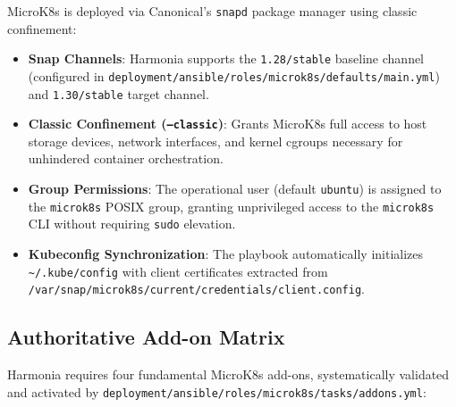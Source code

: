 MicroK8s is deployed via Canonical's \texttt{snapd} package manager using classic confinement:
\begin{itemize}
    \item \textbf{Snap Channels}: Harmonia supports the \texttt{1.28/stable} baseline channel (configured in \texttt{deployment/ansible/roles/microk8s/defaults/main.yml}) and \texttt{1.30/stable} target channel.
    \item \textbf{Classic Confinement (\texttt{--classic})}: Grants MicroK8s full access to host storage devices, network interfaces, and kernel cgroups necessary for unhindered container orchestration.
    \item \textbf{Group Permissions}: The operational user (default \texttt{ubuntu}) is assigned to the \texttt{microk8s} POSIX group, granting unprivileged access to the \texttt{microk8s} CLI without requiring \texttt{sudo} elevation.
    \item \textbf{Kubeconfig Synchronization}: The playbook automatically initializes \texttt{\textasciitilde/.kube/config} with client certificates extracted from \texttt{/var/snap/microk8s/current/credentials/client.config}.
\end{itemize}

\subsection{Authoritative Add-on Matrix}

Harmonia requires four fundamental MicroK8s add-ons, systematically validated and activated by \texttt{deployment/ansible/roles/microk8s/tasks/addons.yml}:


